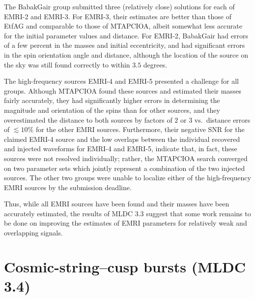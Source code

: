 \documentclass{iopart}
\begin{document}
The BabakGair group submitted three (relatively close) solutions for each of EMRI-2 and EMRI-3.  For EMRI-3, their estimates are better than those of EtfAG and comparable to those of MTAPCIOA, albeit somewhat less accurate for the initial parameter values and distance.  For EMRI-2, BabakGair had errors of a few percent in the masses and initial eccentricity, and had significant errors in the spin orientation angle and distance, although the location of the source on the sky was still found correctly to within $3.5$ degrees.

The high-frequency sources EMRI-4 and EMRI-5 presented a challenge for all groups.  Although MTAPCIOA found these sources and estimated their masses fairly accurately, they had significantly higher errors in determining the magnitude and orientation of the spins than for other sources, and they overestimated the distance to both sources by factors of $2$ or $3$ vs.~distance errors of $\lesssim 10\%$ for the other EMRI sources.  Furthermore, their negative SNR for the claimed EMRI-4 source and the low overlaps between the individual recovered and injected waveforms for EMRI-4 and EMRI-5, indicate that, in fact, these sources were not resolved individually; rather, the MTAPCIOA search converged on two parameter sets which jointly represent a combination of the two injected sources.   The other two groups were unable to localize either of the high-frequency EMRI sources by the submission deadline.

Thus, while all EMRI sources have been found and their masses have been accurately estimated, the results of MLDC 3.3 suggest that some work remains to be done on improving the estimates of EMRI parameters for relatively weak and overlapping signals.


\section{Cosmic-string--cusp bursts (MLDC 3.4)}

\end{document}
